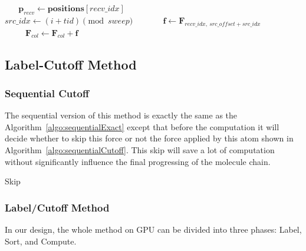 \documentclass[12pt]{article}
\begin{document}
\begin{algorithm}
\begin{algorithmic}[1]
    \State $\mathbf{p}_{recv} \gets \mathbf{positions}[recv\_idx]$ 
    
        \State $src\_idx \gets (i + tid) \pmod{sweep}$
        \State $\mathbf{f} \gets \mathbf{F}_{recv\_idx, \ src\_offset + src\_idx}$
        
        \State $\mathbf{F}_{col} \gets \mathbf{F}_{col} + \mathbf{f}$
        \State {} 
    \EndFor
    
    \State {}
    \State {}
    
    \State {}
\EndIf
\end{algorithmic}
\end{algorithm}

\subsection{Label-Cutoff Method}
\subsubsection{Sequential Cutoff}
The sequential version of this method is exactly the same as the Algorithm~\ref{algo:sequentialExact} except that before the computation it will decide whether to skip this force or not the force applied by this atom shown in Algorithm~\ref{algo:sequentialCutoff}. This skip will save a lot of computation without significantly influence the final progressing of the molecule chain.

\begin{algorithm}
\caption{Sequential Cutoff Computations} \label{algo:sequentialCutoff}
\begin{algorithmic}[1]
         
            \State Skip
        \EndIf
    \EndFor
\EndFor
\end{algorithmic}
\end{algorithm}

\subsubsection{Label/Cutoff Method}
In our design, the whole method on GPU can be divided into three phases: Label, Sort, and Compute.
\end{document}
